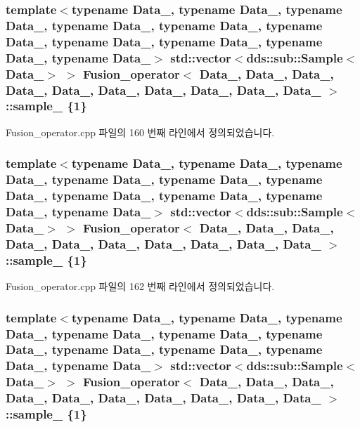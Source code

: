 \subsubsection[{\texorpdfstring{sample\+\_\+0}{sample_0}}]{\setlength{\rightskip}{0pt plus 5cm}template$<$typename Data\+\_, typename Data\+\_, typename Data\+\_, typename Data\+\_, typename Data\+\_, typename Data\+\_, typename Data\+\_, typename Data\+\_, typename Data\+\_, typename Data\+\_$>$ std\+::vector$<$dds\+::sub\+::\+Sample$<$Data\+\_$>$ $>$ {\bf Fusion\+\_\+operator}$<$ Data\+\_, Data\+\_, Data\+\_, Data\+\_, Data\+\_, Data\+\_, Data\+\_, Data\+\_, Data\+\_, Data\+\_ $>$\+::sample\+\_ \{1\}}\hypertarget{classFusion__operator_ab24eda6a56115e1eb0ab2c89a2632436}{}\label{classFusion__operator_ab24eda6a56115e1eb0ab2c89a2632436}


Fusion\+\_\+operator.\+cpp 파일의 160 번째 라인에서 정의되었습니다.

\subsubsection[{\texorpdfstring{sample\+\_\+1}{sample_1}}]{\setlength{\rightskip}{0pt plus 5cm}template$<$typename Data\+\_, typename Data\+\_, typename Data\+\_, typename Data\+\_, typename Data\+\_, typename Data\+\_, typename Data\+\_, typename Data\+\_, typename Data\+\_, typename Data\+\_$>$ std\+::vector$<$dds\+::sub\+::\+Sample$<$Data\+\_$>$ $>$ {\bf Fusion\+\_\+operator}$<$ Data\+\_, Data\+\_, Data\+\_, Data\+\_, Data\+\_, Data\+\_, Data\+\_, Data\+\_, Data\+\_, Data\+\_ $>$\+::sample\+\_ \{1\}}\hypertarget{classFusion__operator_afe367eeae918067d7d26c90bc0be202d}{}\label{classFusion__operator_afe367eeae918067d7d26c90bc0be202d}


Fusion\+\_\+operator.\+cpp 파일의 162 번째 라인에서 정의되었습니다.

\subsubsection[{\texorpdfstring{sample\+\_\+2}{sample_2}}]{\setlength{\rightskip}{0pt plus 5cm}template$<$typename Data\+\_, typename Data\+\_, typename Data\+\_, typename Data\+\_, typename Data\+\_, typename Data\+\_, typename Data\+\_, typename Data\+\_, typename Data\+\_, typename Data\+\_$>$ std\+::vector$<$dds\+::sub\+::\+Sample$<$Data\+\_$>$ $>$ {\bf Fusion\+\_\+operator}$<$ Data\+\_, Data\+\_, Data\+\_, Data\+\_, Data\+\_, Data\+\_, Data\+\_, Data\+\_, Data\+\_, Data\+\_ $>$\+::sample\+\_ \{1\}}\hypertarget{classFusion__operator_a1a65f84d529180cd77defee525bc7bd6}{}\label{classFusion__operator_a1a65f84d529180cd77defee525bc7bd6}


